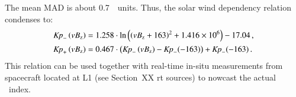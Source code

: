 \begin{figure}
\end{figure}
The mean MAD is about 0.7~\Kp{}~units. Thus, the solar wind dependency relation condenses to:
\begin{align}
	\text{\textit{Kp}}_-\left(vB_\text{z}\right) &= 1.258 \cdot \ln\left(\left(vB_\text{z} + 163\right)^2 + \num{1.416e6}\right) - 17.04	\,,	\label{eq:kpvsvbz_dependency_function_negative}\\
	\text{\textit{Kp}}_+\left(vB_\text{z}\right) &= 0.467 \cdot \left(\text{\textit{Kp}}_-\left(vB_\text{z}\right) - \text{\textit{Kp}}_-(-163)\right) + \text{\textit{Kp}}_-(-163)	\,.	\label{eq:kpvsvbz_dependency_function_positive}
\end{align}
This relation can be used together with real-time in-situ measurements from spacecraft located at L1 (see Section~XX rt sources) to nowcast the actual \Kp~index.\\

